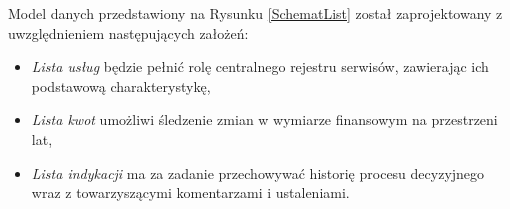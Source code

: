 

Model danych przedstawiony na Rysunku \ref{SchematList} został zaprojektowany z uwzględnieniem następujących założeń:

\begin{itemize}
    \item \emph{Lista usług} będzie pełnić rolę centralnego rejestru serwisów, zawierając ich podstawową charakterystykę,
    \item \emph{Lista kwot} umożliwi śledzenie zmian w wymiarze finansowym na przestrzeni lat,
    \item \emph{Lista indykacji} ma za zadanie przechowywać historię procesu decyzyjnego wraz z towarzyszącymi komentarzami i ustaleniami.
\end{itemize}



